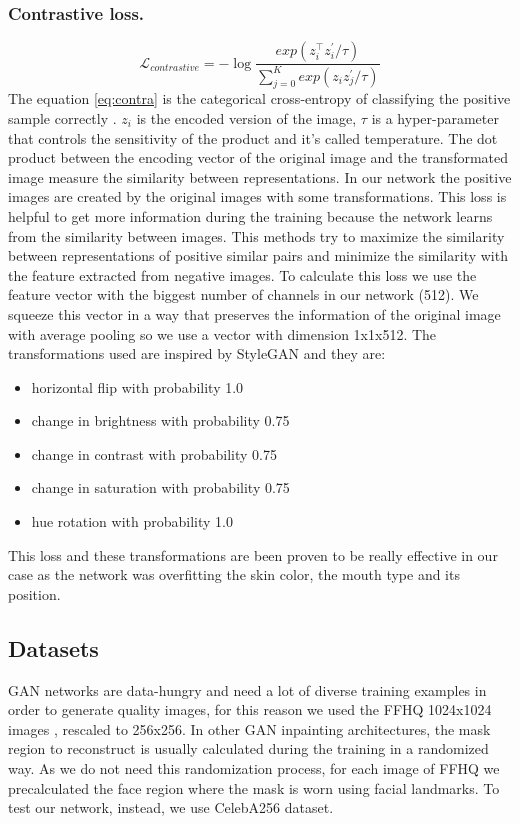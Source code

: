\documentclass[10pt,twocolumn,letterpaper]{article}
\begin{document}
\subsubsection{Contrastive loss.}
\begin{dmath}\label{eq:contra}
    \mathcal{L}_{contrastive} = - \log{\frac{exp(z_{i}^\intercal
    z_{i}^{'}/\tau)}{\sum_{j=0}^{K}exp(z_{i}z_{j}^{'}/\tau)}}
\end{dmath}
The equation \eqref{eq:contra} is the categorical cross-entropy of classifying
the positive sample correctly \cite{oord2018representation}. $z_i$ is the
encoded version of the image, \(\tau\) is a hyper-parameter that controls the
sensitivity of the product and it's
called temperature. The dot product between the encoding vector of the original
image and the transformated image measure the similarity between representations.
In our network the positive images are created by the original images with some
transformations. This loss is helpful to get
more information during the training because the network learns from the
similarity between images. This methods try to maximize the similarity between
representations of positive similar pairs and minimize the similarity with the
feature extracted from negative images\cite{le2020contrastive}.
To calculate this loss we use the feature vector with the biggest number of
channels in our network (512). We squeeze this vector in a way that preserves the
information of the original image with average pooling so we use a vector with
dimension 1x1x512. The transformations used are inspired by
StyleGAN\cite{karras2020analyzing} and they are:
\begin{itemize}
  \item horizontal flip with probability 1.0
  \item change in brightness with probability 0.75
  \item change in contrast with probability 0.75
  \item change in saturation with probability 0.75
  \item hue rotation with probability 1.0
\end{itemize}
This loss and these transformations are been proven to be really effective in
our case as the network was overfitting the skin color, the mouth type and its
position.

\subsection{Datasets}
GAN networks are data-hungry and need a lot of diverse training examples in
order to generate quality images, for this reason we used the FFHQ 1024x1024
images \cite{karras2019style}, rescaled to 256x256.  In other GAN inpainting
architectures, the mask region to reconstruct is usually calculated during the
training in a randomized way.  As we do not need this randomization process, for
each image of FFHQ we precalculated the face region where the mask is worn
using facial landmarks. To test our network, instead, we use CelebA256 dataset.
\end{document}
